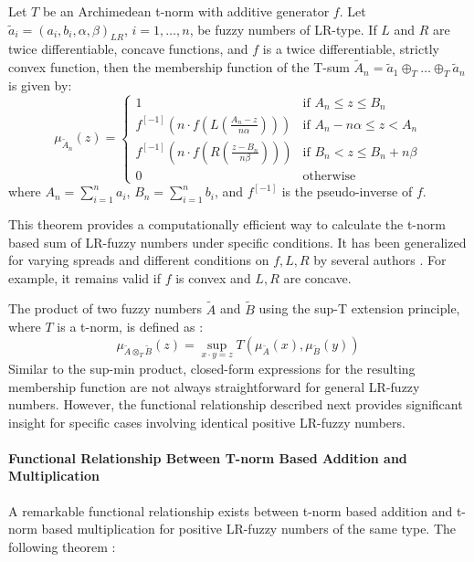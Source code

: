 \begin{theorem}
\label{thm:tnorm_addition_lr}
Let $T$ be an Archimedean t-norm with additive generator $f$. Let $\tilde{a}_i = (a_i, b_i, \alpha, \beta)_{LR}$, $i=1, \dots, n$, be fuzzy numbers of LR-type. If $L$ and $R$ are twice differentiable, concave functions, and $f$ is a twice differentiable, strictly convex function, then the membership function of the T-sum $\tilde{A}_n = \tilde{a}_1 \oplus_T \dots \oplus_T \tilde{a}_n$ is given by:
\begin{equation}
\mu_{\tilde{A}_n}(z) =
\begin{cases}
1 & \text{if } A_n \le z \le B_n \\
f^{[-1]}\left( n \cdot f\left(L\left(\frac{A_n-z}{n\alpha}\right)\right) \right) & \text{if } A_n - n\alpha \le z < A_n \\
f^{[-1]}\left( n \cdot f\left(R\left(\frac{z-B_n}{n\beta}\right)\right) \right) & \text{if } B_n < z \le B_n + n\beta \\
0 & \text{otherwise}
\end{cases}
\end{equation}
where $A_n = \sum_{i=1}^n a_i$, $B_n = \sum_{i=1}^n b_i$, and $f^{[-1]}$ is the pseudo-inverse of $f$.
\end{theorem}
\begin{remark}
This theorem provides a computationally efficient way to calculate the t-norm based sum of LR-fuzzy numbers under specific conditions. It has been generalized for varying spreads and different conditions on $f, L, R$ by several authors \cite[p.29]{FULLER2}. For example, it remains valid if $f$ is convex and $L,R$ are concave.
\end{remark}
The product of two fuzzy numbers $\tilde{A}$ and $\tilde{B}$ using the sup-T extension principle, where $T$ is a t-norm, is defined as \cite[p.20]{FULLER2}:
\begin{equation}
\mu_{\tilde{A} \otimes_T \tilde{B}}(z) = \sup_{x \cdot y = z} T(\mu_{\tilde{A}}(x), \mu_{\tilde{B}}(y))
\end{equation}
Similar to the sup-min product, closed-form expressions for the resulting membership function are not always straightforward for general LR-fuzzy numbers. However, the functional relationship described next provides significant insight for specific cases involving identical positive LR-fuzzy numbers.


\paragraph{Functional Relationship Between T-norm Based Addition and Multiplication}
A remarkable functional relationship exists between t-norm based addition and t-norm based multiplication for positive LR-fuzzy numbers of the same type. The following theorem \cite[Thm. 1.8.1]{FULLER2}:

